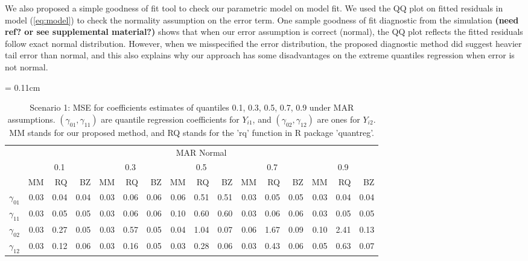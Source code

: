 \documentclass[12pt]{article}
\begin{document}
We also proposed a simple goodness of fit tool to check our parametric
model on model fit. We used the QQ plot on fitted residuals in model
(\ref{eq:model}) to check the normality assumption on the error
term. One sample goodness of fit diagnostic from the simulation {\bf
  (need ref? or see supplemental material?)} shows that when our error
assumption is correct (normal), the QQ plot reflects the fitted
residuals follow exact normal distribution. However, when we
misspecified the error distribution, the proposed diagnostic method
did suggest heavier tail error than normal, and this also explains why
our approach has some disadvantages on the extreme quantiles
regression when error is not normal.

\begin{table}[ht]
  \renewcommand{\arraystretch}{1.3}
  \centering
  \caption{Scenario 1: MSE for coefficients estimates of quantiles
    0.1, 0.3, 0.5, 0.7, 0.9 under MAR assumptions. $(\gamma_{01}, \gamma_{11})$
    are quantile regression coefficients for $Y_{i1}$, and $(\gamma_{02}, \gamma_{12})$
    are ones for $Y_{i2}$. MM stands for our proposed method, and RQ stands for the 'rq'
    function in R package 'quantreg'.}\label{tab:simh2}
  \vspace{10pt}
  \tabcolsep = 0.11cm
  \begin{tabular}{rrrrrrrrrrrrrrrr}
    \toprule
    & \multicolumn{15}{c}{MAR Normal} \\
    \cline{2-16}
    &  \multicolumn{3}{c}{0.1} &  \multicolumn{3}{c}{0.3} &  \multicolumn{3}{c}{0.5} &
    \multicolumn{3}{c}{0.7} &  \multicolumn{3}{c}{0.9} \\
    \cline{2-16}
    & MM   & RQ   & BZ   & MM   & RQ   & BZ   & MM   & RQ   & BZ   & MM   & RQ   & BZ   & MM   & RQ   & BZ   \\
    \hline
    $\gamma_{01}$ & 0.03 & 0.04 & 0.04 & 0.03 & 0.06 & 0.06 & 0.06 & 0.51 & 0.51 & 0.03 & 0.05 & 0.05 & 0.03 & 0.04 & 0.04 \\
    $\gamma_{11}$ & 0.03 & 0.05 & 0.05 & 0.03 & 0.06 & 0.06 & 0.10 & 0.60 & 0.60 & 0.03 & 0.06 & 0.06 & 0.03 & 0.05 & 0.05 \\
    $\gamma_{02}$ & 0.03 & 0.27 & 0.05 & 0.03 & 0.57 & 0.05 & 0.04 & 1.04 & 0.07 & 0.06 & 1.67 & 0.09 & 0.10 & 2.41 & 0.13 \\
    $\gamma_{12}$ & 0.03 & 0.12 & 0.06 & 0.03 & 0.16 & 0.05 & 0.03 & 0.28 & 0.06 & 0.03 & 0.43 & 0.06 & 0.05 & 0.63 & 0.07 \\
    \bottomrule
  \end{tabular}


\end{table}
\end{document}
